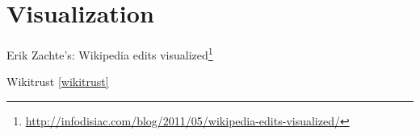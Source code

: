 \section{Visualization}\label{sec:visualization}


\begin{todos}
    \item Erik Zachte's: Wikipedia edits visualized\footnote{\url{http://infodisiac.com/blog/2011/05/wikipedia-edits-visualized/}}
    \item Wikitrust \ref{wikitrust}
\end{todos}

